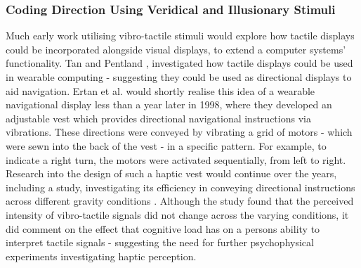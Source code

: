 \documentclass{interim}
\begin{document}
\subsubsection{Coding Direction Using Veridical and Illusionary Stimuli}
Much early work utilising vibro-tactile stimuli would explore how tactile displays could be incorporated alongside visual displays, to extend a computer systems’ functionality. Tan and Pentland \cite{629923}, investigated how tactile displays could be used in wearable computing - suggesting they could be used as directional displays to aid navigation. Ertan et al. \cite{729547} would shortly realise this idea of a wearable navigational display less than a year later in 1998, where they developed an adjustable vest which provides directional navigational instructions via vibrations. These directions were conveyed by vibrating a grid of motors - which were sewn into the back of the vest - in a specific pattern. For example, to indicate a right turn, the motors were activated sequentially, from left to right. Research into the design of such a haptic vest would continue over the years, including a study, investigating its efficiency in conveying directional instructions across different gravity conditions \cite{998954}. Although the study found that the perceived intensity of vibro-tactile signals did not change across the varying conditions, it did comment on the effect that cognitive load has on a persons ability to interpret tactile signals - suggesting the need for further psychophysical experiments investigating haptic perception.
\end{document}
